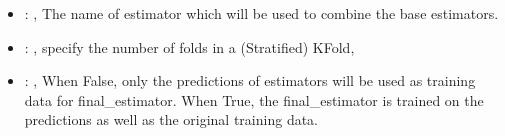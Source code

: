 \begin{itemize}
    \item {}: ,
      The name of estimator which will be used to combine the base estimators.

    \item {}: ,
      specify the number of folds in a (Stratified) KFold,

    \item {}: ,
      When False, only the predictions of estimators will be used as training
      data for final\_estimator. When True, the final\_estimator is trained on the predictions
      as well as the original training data.
  \end{itemize}
